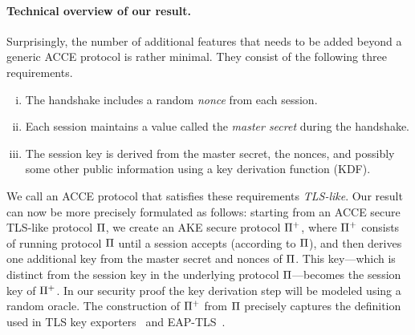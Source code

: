 \paragraph{Technical overview of our result.}
Surprisingly,
the number of additional features that needs to be added beyond a generic ACCE protocol is rather minimal.
They consist of the following three requirements.
%
%
%
%
%
\begin{enumerate}[(i)]
	\item The handshake includes a random \emph{nonce} from each session.
	\item Each session maintains a value called the \emph{master secret} during the handshake.
	\item The session key is derived from the master secret, the nonces, and possibly some other public information using a key derivation function (KDF).
\end{enumerate}

We call an ACCE protocol that satisfies these requirements \emph{TLS-like}.
Our result can now be more precisely formulated as follows:
starting from an ACCE secure TLS-like protocol $\mathrm{\Pi}$,
we create an AKE secure protocol $\mathrm{\Pi}^{+}$,
where $\mathrm{\Pi}^{+}$ consists of running protocol $\mathrm{\Pi}$ until a session accepts
(according to $\mathrm{\Pi}$),
and then derives one additional key from the master secret and nonces of $\mathrm{\Pi}$.
This key---which is distinct from the session key in the underlying protocol $\mathrm{\Pi}$---becomes the session key of $\mathrm{\Pi}^{+}$.
In our security proof the key derivation step will be modeled using a random oracle.
The construction of $\mathrm{\Pi}^{+}$ from $\mathrm{\Pi}$ precisely captures the definition used in TLS key exporters~\cite{IETF:RFC5705:TLS-key-exporters}
and EAP-TLS~\cite{IETF:RFC5216:EAP-TLS}.


